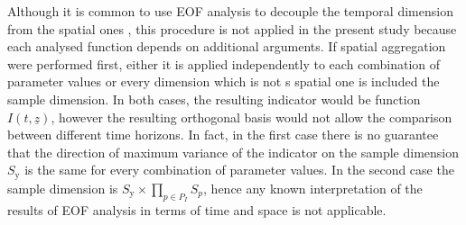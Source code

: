 Although it is common to use \gls{EOF} analysis to decouple the temporal dimension from the spatial ones \cite{2007HannachiEmpiricalOrthogonal}, this procedure is not applied in the present study because each analysed function depends on additional arguments. If spatial aggregation were performed first, either it is applied independently to each combination of parameter values or every dimension which is not s spatial one is included the sample dimension. In both cases, the resulting \gls{indicator} would be function $I(t, \underline{z})$, however the resulting orthogonal basis would not allow the comparison between different time horizons. In fact, in the first case there is no guarantee that the direction of maximum variance of the indicator on the sample dimension $S_\text{y}$ is the same for every combination of parameter values. In the second case the sample dimension is $S_\text{y} \times \prod_{p \in P_I} S_p$, hence any known interpretation of the results of \gls{EOF} analysis in terms of time and space is not applicable.

